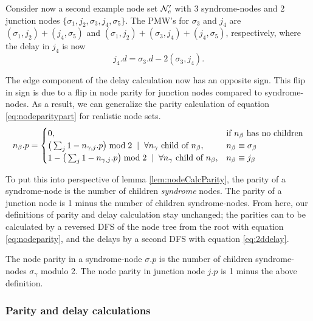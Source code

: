 Consider now a second example node set $\mathcal{N}_e'$ with 3 syndrome-nodes and 2 junction nodes $\{\sigma_1, j_2, \sigma_3, j_4, \sigma_5\}$. The PMW's for $\sigma_3$ and $j_4$ are $(\sigma_1, j_2) + (j_4, \sigma_5)$ and  $(\sigma_1, j_2) + (\sigma_3, j_4) + (j_4, \sigma_5)$, respectively, where the delay in $j_4$ is now
\begin{equation*}
  j_4.d = \sigma_3.d - 2(\sigma_3, j_4).
\end{equation*}

The edge component of the delay calculation now has an opposite sign. This flip in sign is due to a flip in node parity for junction nodes compared to syndrome-nodes. As a result, we can generalize the parity calculation of equation \ref{eq:nodeparitypart} for realistic node sets.
\begin{equation}\label{eq:nodeparity}
  n_\beta.p =
  \begin{cases}
    0, & \mbox{if $n_\beta$ has no children}  \\
    \big( \sum_{j} 1-n_{\gamma,j}.p \big ) \bmod 2 \hspace{.2cm} | \hspace{.2cm} \forall n_\gamma \mbox{ child of } n_\beta, & n_\beta \equiv \sigma_\beta \\
    1 - \big( \sum_{j} 1-n_{\gamma,j}.p \big ) \bmod 2 \hspace{.2cm} | \hspace{.2cm} \forall n_\gamma \mbox{ child of } n_\beta, & n_\beta \equiv j_\beta
  \end{cases}
\end{equation}

To put this into perspective of lemma \ref{lem:nodeCalcParity}, the parity of a syndrome-node is the number of children \emph{syndrome} nodes. The parity of a junction node is 1 minus the number of children syndrome-nodes. From here, our definitions of parity and delay calculation stay unchanged; the parities can to be calculated by a reversed DFS of the node tree from the root with equation \ref{eq:nodeparity}, and the delays by a second DFS with equation \ref{eq:2ddelay}.

\begin{lemma}\label{lem:nodecalc_junction}
  The node parity in a syndrome-node $\sigma.p$ is the number of children syndrome-nodes $\sigma_\gamma$ modulo 2. The node parity in junction node $j.p$ is 1 minus the above definition.
\end{lemma}

\subsubsection{Parity and delay calculations}

